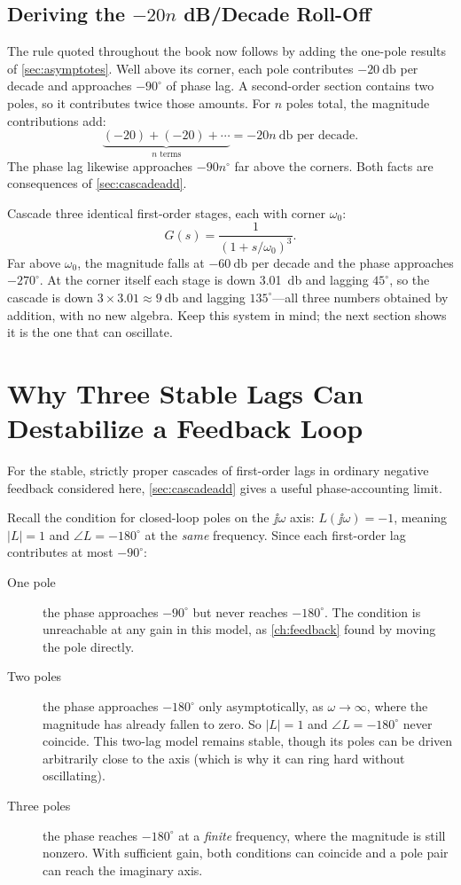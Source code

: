 \subsection{Deriving the \texorpdfstring{\(-20n\)}{-20n} dB/Decade Roll-Off}
The rule quoted throughout the book now follows by adding the one-pole results of
\cref{sec:asymptotes}. Well above its corner, each pole contributes
\(-\SI{20}{\decibel}\) per decade and approaches \(-90^\circ\) of phase lag. A
second-order section contains two poles, so it contributes twice those amounts. For
\(n\) poles total, the magnitude contributions add:
\[
\underbrace{(-20)+(-20)+\cdots}_{n\text{ terms}}
=-20n\ \si{\decibel}\text{ per decade}.
\]
The phase lag likewise approaches \(-90n^\circ\) far above the corners. Both facts
are consequences of \cref{sec:cascadeadd}.

\begin{workedbox}
Cascade three identical first-order stages, each with corner \(\omega_0\):
\[
G(s)=\frac{1}{(1+s/\omega_0)^3}.
\]
Far above \(\omega_0\), the magnitude falls at \(-\SI{60}{\decibel}\) per decade and
the phase approaches \(-270^\circ\). At the corner itself each stage is down
\SI{3.01}{\decibel} and lagging \(45^\circ\), so the cascade is down
\(3\times3.01\approx\SI{9}{\decibel}\) and lagging \(135^\circ\)---all three numbers
obtained by addition, with no new algebra. Keep this system in mind; the next section
shows it is the one that can oscillate.
\end{workedbox}

\section{Why Three Stable Lags Can Destabilize a Feedback Loop}
\label{sec:threepoles}
For the stable, strictly proper cascades of first-order lags in ordinary negative
feedback considered here, \cref{sec:cascadeadd} gives a useful phase-accounting
limit.

Recall the condition for closed-loop poles on the \(\jj\omega\) axis:
\(L(\jj\omega)=-1\), meaning \(|L|=1\) and \(\angle L=-180^\circ\) at the \emph{same}
frequency. Since each first-order lag contributes at most \(-90^\circ\):
\begin{description}
\item[One pole] the phase approaches \(-90^\circ\) but never reaches
\(-180^\circ\). The condition is unreachable at any gain in this model, as
\cref{ch:feedback} found by moving the pole directly.
\item[Two poles] the phase approaches \(-180^\circ\) only asymptotically, as
\(\omega\to\infty\), where the magnitude has already fallen to zero. So \(|L|=1\) and
\(\angle L=-180^\circ\) never coincide. This two-lag model remains stable, though
its poles can be driven arbitrarily close to the axis (which is why it can ring hard
without oscillating).
\item[Three poles] the phase reaches \(-180^\circ\) at a \emph{finite} frequency, where
the magnitude is still nonzero. With sufficient gain, both conditions can coincide
and a pole pair can reach the imaginary axis.
\end{description}

